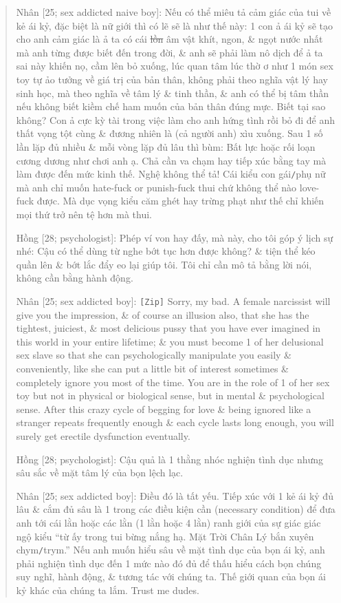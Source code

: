 \documentclass[12pt,oneside]{book}
\begin{document}
\begin{quote}
	{\sf Nhân [25; sex addicted naive boy]}: Nếu có thể miêu tả cảm giác của tui về kẻ ái kỷ, đặc biệt là nữ giới thì có lẽ sẽ là như thế này: 1 con ả ái kỷ sẽ tạo cho anh cảm giác là ả ta có cái \st{lồn} âm vật khít, ngon, \& ngọt nước nhất mà anh từng được biết đến trong đời, \& anh sẽ phải làm nô dịch để ả ta sai này khiến nọ, cầm lên bỏ xuống, lúc quan tâm lúc thờ ơ như 1 món sex toy tự ảo tưởng về giá trị của bản thân, không phải theo nghĩa vật lý hay sinh học, mà theo nghĩa về tâm lý \& tinh thần, \& anh có thể bị tâm thần nếu không biết kiềm chế ham muốn của bản thân đúng mực. Biết tại sao không? Con ả cực kỳ tài trong việc làm cho anh hứng tình rồi bỏ đi để anh thất vọng tột cùng \& đương nhiên là (cả người anh) xìu xuống. Sau 1 số lần lặp đủ nhiều \& mỗi vòng lặp đủ lâu thì bùm: Bất lực hoặc rối loạn cương dương như chơi anh ạ. Chả cần va chạm hay tiếp xúc bằng tay mà làm được đến mức kinh thế. Nghệ không thể tả! Cái kiểu con gái{\tt/}phụ nữ mà anh chỉ muốn hate-fuck or punish-fuck thui chứ không thể nào love-fuck được. Mà dục vọng kiểu căm ghét hay trừng phạt như thế chỉ khiến mọi thứ trở nên tệ hơn mà thui.
	
	{\sf Hồng [28; psychologist]:} Phép ví von hay đấy, mà này, cho tôi góp ý lịch sự nhé: Cậu có thể dùng từ nghe bớt tục hơn được không? \& tiện thể kéo quần lên \& bớt lắc đẩy eo lại giúp tôi. Tôi chỉ cần mô tả bằng lời nói, không cần bằng hành động.
	
	{\sf Nhân [25; sex addicted boy]:} {\tt[Zip]} Sorry, my bad. A female narcissist will give you the impression, \& of course an illusion also, that she has the tightest, juiciest, \& most delicious pussy that you have ever imagined in this world in your entire lifetime; \& you must become 1 of her delusional sex slave so that she can psychologically manipulate you easily \& conveniently, like she can put a little bit of interest sometimes \& completely ignore you most of the time. You are in the role of 1 of her sex toy but not in physical or biological sense, but in mental \& psychological sense. After this crazy cycle of begging for love \& being ignored like a stranger repeats frequently enough \& each cycle lasts long enough, you will surely get erectile dysfunction eventually.
	
	{\sf Hồng [28; psychologist]:} Cậu quả là 1 thằng nhóc nghiện tình dục nhưng sâu sắc về mặt tâm lý của bọn lệch lạc.
	
	{\sf Nhân [25; sex addicted boy]:} Điều đó là tất yếu. Tiếp xúc với 1 kẻ ái kỷ đủ lâu \& cắm đủ sâu là 1 trong các điều kiện cần (necessary condition) để đưa anh tới cái lằn hoặc các lằn (1 lằn hoặc 4 lằn) ranh giới của sự giác giác ngộ kiểu ``từ ấy trong tui bừng nắng hạ. Mặt Trời Chân Lý bắn xuyên chym{\tt/}trym.'' Nếu anh muốn hiểu sâu về mặt tình dục của bọn ái kỷ, anh phải nghiện tình dục đến 1 mức nào đó đủ để thấu hiểu cách bọn chúng suy nghĩ, hành động, \& tương tác với chúng ta. Thế giới quan của bọn ái kỷ khác của chúng ta lắm. Trust me dudes.
\end{quote}
\end{document}
